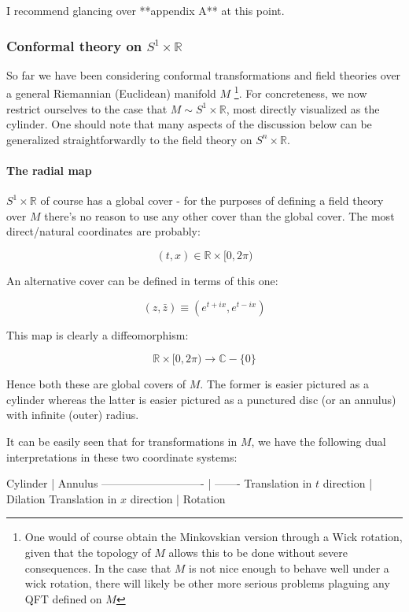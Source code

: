 I recommend glancing over **appendix A** at this point.

\subsubsection{ Conformal theory on $S^1 \times \mathbb{R}$}

So far we have been considering conformal transformations and field theories over a general Riemannian (Euclidean) manifold $M$ \footnote {One would of course obtain the Minkovskian version through a Wick rotation, given that the topology of $M$ allows this to be done without severe consequences. In the case that $M$ is not nice enough to behave well under a wick rotation, there will likely be other more serious problems plaguing any QFT defined on $M$}. For concreteness, we now restrict ourselves to the case that $M \sim S^1 \times \mathbb{R}$, most directly visualized as the cylinder. One should note that many aspects of the discussion below can be generalized straightforwardly to the field theory on $S^n \times \mathbb{R}$.

\paragraph{ The radial map}

$S^1 \times \mathbb{R}$ of course has a global cover - for the purposes of defining a field theory over $M$ there's no reason to use any other cover than the global cover. The most direct/natural coordinates are probably:

$$(t, x) \in  \mathbb R \times [0, 2\pi)$$

An alternative cover can be defined in terms of this one:

$$(z, \bar z) \equiv (e^{t + ix}, e^{ t - ix})$$

This map is clearly a diffeomorphism:

$$\mathbb R \times [0, 2\pi) \to \mathbb C - \{0\}$$

Hence both these are global covers of $M$. The former is easier pictured as a cylinder whereas the latter is easier pictured as a punctured disc (or an annulus) with infinite (outer) radius.

It can be easily seen that for transformations in $M$, we have the following dual interpretations in these two coordinate systems:

Cylinder                     | Annulus
---------------------------- | -------
Translation in $t$ direction | Dilation
Translation in $x$ direction | Rotation

